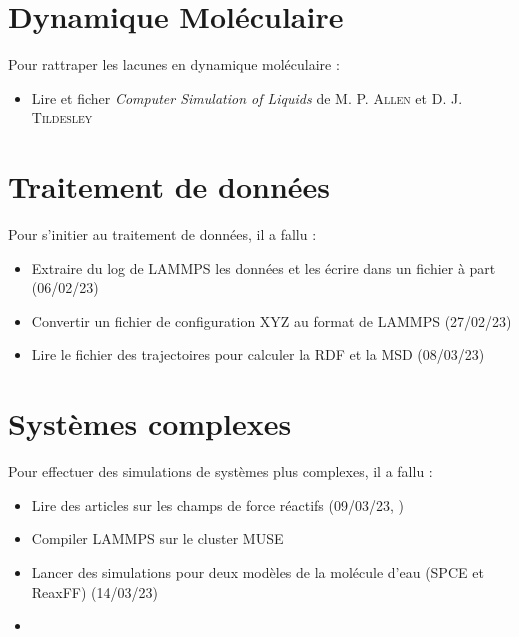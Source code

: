 \documentclass[11pt, a4paper]{article}
\begin{document}
\section{Dynamique Moléculaire}

Pour rattraper les lacunes en dynamique moléculaire :
\begin{itemize}
	\item Lire et ficher \emph{Computer Simulation of Liquids} de \textsc{M. P. Allen} et \textsc{D. J. Tildesley}
\end{itemize}

\section{Traitement de données}

Pour s'initier au traitement de données, il a fallu :
\begin{itemize}
	\item Extraire du log de LAMMPS les données et les écrire dans un fichier à part (06/02/23)
	\item Convertir un fichier de configuration XYZ au format de LAMMPS (27/02/23)
	\item Lire le fichier des trajectoires pour calculer la RDF et la MSD (08/03/23)
\end{itemize}

\section{Systèmes complexes}

Pour effectuer des simulations de systèmes plus complexes, il a fallu :
\begin{itemize}
	\item Lire des articles sur les champs de force réactifs (09/03/23, )
	\item Compiler LAMMPS sur le cluster MUSE
	\item Lancer des simulations pour deux modèles de la molécule d'eau (SPCE et ReaxFF) (14/03/23)
	\item
\end{itemize}
\end{document}
